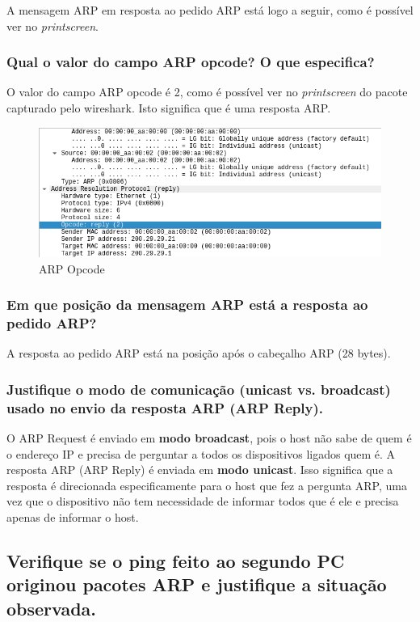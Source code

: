 A mensagem ARP em resposta ao pedido ARP está logo a seguir, como é possível ver no \textit{printscreen}.

\subsubsection{Qual o valor do campo ARP opcode? O que especifica?}

O valor do campo ARP opcode é 2, como é possível ver no \textit{printscreen} do pacote capturado pelo wireshark. Isto significa que é uma resposta ARP.

\begin{figure} [h]
    \centering
    \includegraphics[width=0.8\linewidth]{images/opcode-arp-reply.png}
    \caption{ARP Opcode}
    \label{fig:enter-label}
\end{figure}

\subsubsection{Em que posição da mensagem ARP está a resposta ao pedido ARP?}

A resposta ao pedido ARP está na posição após o cabeçalho ARP (28 bytes).

\subsubsection{Justifique o modo de comunicação (unicast vs. broadcast) usado no envio da resposta ARP (ARP Reply).}

O ARP Request é enviado em \textbf{modo broadcast}, pois o host não sabe de quem é o endereço IP e precisa de perguntar a todos os dispositivos ligados quem é. A resposta ARP (ARP Reply) é enviada em \textbf{modo unicast}. Isso significa que a resposta é direcionada especificamente para o host que fez a pergunta ARP, uma vez que o dispositivo não tem necessidade de informar todos que é ele e precisa apenas de informar o host.

\subsection{Verifique se o ping feito ao segundo PC originou pacotes ARP e justifique a situação observada.}

